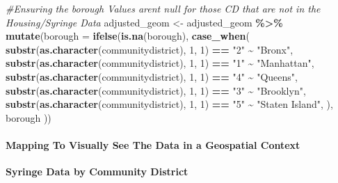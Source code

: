 \documentclass[
]{article}
\newenvironment{Shaded}{\begin{snugshade}}{\end{snugshade}}
\newcommand{\AttributeTok}[1]{\textcolor[rgb]{0.13,0.29,0.53}{#1}}
\newcommand{\CommentTok}[1]{\textcolor[rgb]{0.56,0.35,0.01}{\textit{#1}}}
\newcommand{\DecValTok}[1]{\textcolor[rgb]{0.00,0.00,0.81}{#1}}
\newcommand{\FunctionTok}[1]{\textcolor[rgb]{0.13,0.29,0.53}{\textbf{#1}}}
\newcommand{\NormalTok}[1]{#1}
\newcommand{\OtherTok}[1]{\textcolor[rgb]{0.56,0.35,0.01}{#1}}
\newcommand{\SpecialCharTok}[1]{\textcolor[rgb]{0.81,0.36,0.00}{\textbf{#1}}}
\newcommand{\StringTok}[1]{\textcolor[rgb]{0.31,0.60,0.02}{#1}}
\begin{document}
\begin{Shaded}
\begin{Highlighting}[]
\CommentTok{\#Ensuring the borough Values arent null for those CD that are not in the Housing/Syringe Data}
\NormalTok{adjusted\_geom }\OtherTok{\textless{}{-}}\NormalTok{ adjusted\_geom }\SpecialCharTok{\%\textgreater{}\%} \FunctionTok{mutate}\NormalTok{(}\AttributeTok{borough =} \FunctionTok{ifelse}\NormalTok{(}\FunctionTok{is.na}\NormalTok{(borough),}
                                    \FunctionTok{case\_when}\NormalTok{(}
                                      \FunctionTok{substr}\NormalTok{(}\FunctionTok{as.character}\NormalTok{(communitydistrict), }\DecValTok{1}\NormalTok{, }\DecValTok{1}\NormalTok{) }\SpecialCharTok{==} \StringTok{"2"} \SpecialCharTok{\textasciitilde{}} \StringTok{"Bronx"}\NormalTok{,}
                                      \FunctionTok{substr}\NormalTok{(}\FunctionTok{as.character}\NormalTok{(communitydistrict), }\DecValTok{1}\NormalTok{, }\DecValTok{1}\NormalTok{) }\SpecialCharTok{==} \StringTok{"1"} \SpecialCharTok{\textasciitilde{}} \StringTok{"Manhattan"}\NormalTok{,}
                                      \FunctionTok{substr}\NormalTok{(}\FunctionTok{as.character}\NormalTok{(communitydistrict), }\DecValTok{1}\NormalTok{, }\DecValTok{1}\NormalTok{) }\SpecialCharTok{==} \StringTok{"4"} \SpecialCharTok{\textasciitilde{}} \StringTok{"Queens"}\NormalTok{,}
                                      \FunctionTok{substr}\NormalTok{(}\FunctionTok{as.character}\NormalTok{(communitydistrict), }\DecValTok{1}\NormalTok{, }\DecValTok{1}\NormalTok{) }\SpecialCharTok{==} \StringTok{"3"} \SpecialCharTok{\textasciitilde{}} \StringTok{"Brooklyn"}\NormalTok{,}
                                      \FunctionTok{substr}\NormalTok{(}\FunctionTok{as.character}\NormalTok{(communitydistrict), }\DecValTok{1}\NormalTok{, }\DecValTok{1}\NormalTok{) }\SpecialCharTok{==} \StringTok{"5"} \SpecialCharTok{\textasciitilde{}} \StringTok{"Staten Island"}\NormalTok{,}
\NormalTok{                                      ),}
\NormalTok{                                    borough}
\NormalTok{                                    ))}
\end{Highlighting}
\end{Shaded}

\paragraph{Mapping To Visually See The Data in a Geospatial
Context}\label{mapping-to-visually-see-the-data-in-a-geospatial-context}

\textbf{Syringe Data by Community District}
\end{document}
